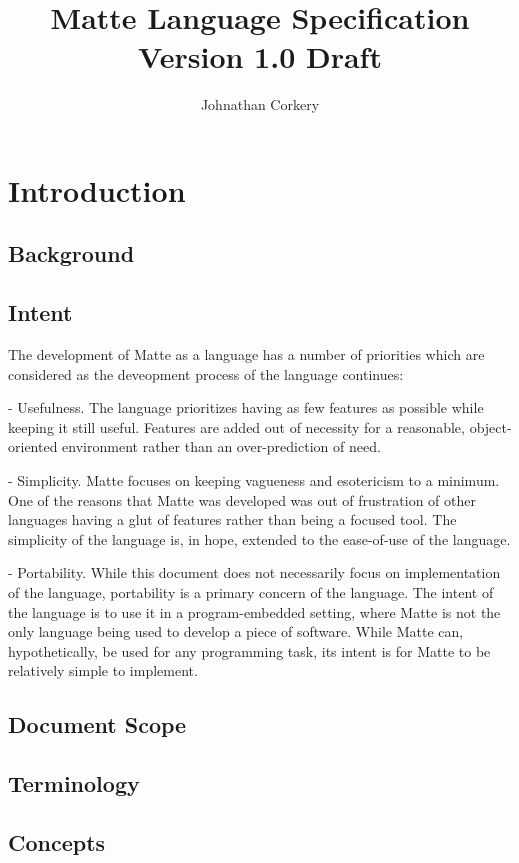 \documentclass[12pt,letterpaper]{report}
\author{Johnathan Corkery}
\title{Matte Language Specification\\
\small Version 1.0 Draft
}
\begin{document}
\maketitle
\tableofcontents


\chapter{Introduction}
\section{Background}    
\section{Intent}

The development of Matte as a language has a number of priorities which are 
considered as the deveopment process of the language continues:

- Usefulness. The language prioritizes having as few features as possible 
  while keeping it still useful. Features are added out of necessity for a reasonable, 
  object-oriented environment rather than an over-prediction of need.

- Simplicity. Matte focuses on keeping vagueness and esotericism to a minimum. One 
  of the reasons that Matte was developed was out of frustration of other 
  languages having a glut of features rather than being a focused tool. The 
  simplicity of the language is, in hope, extended to the ease-of-use of the language.

- Portability. While this document does not necessarily focus on implementation 
  of the language, portability is a primary concern of the language. 
  The intent of the language is to use it in a program-embedded setting, 
  where Matte is not the only language being used to develop a piece of software. 
  While Matte can, hypothetically, be used for any programming task, its intent is 
  for Matte to be relatively simple to implement. 


\section{Document Scope}
\section{Terminology}
\section{Concepts}
\end{document}
